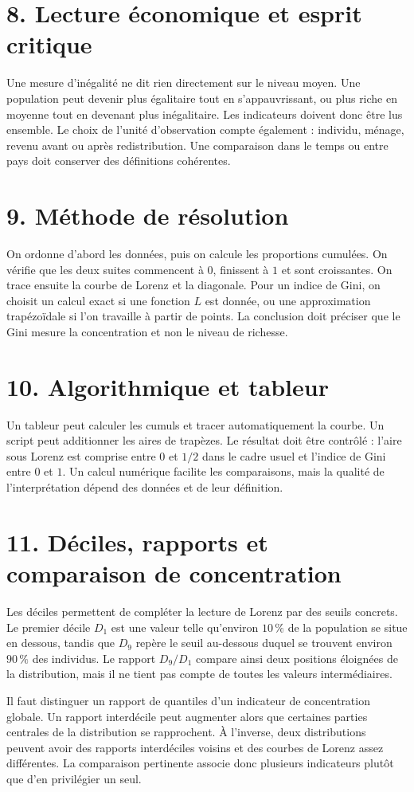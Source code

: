 \section{8. Lecture économique et esprit critique}
Une mesure d'inégalité ne dit rien directement sur le niveau moyen. Une population peut devenir plus égalitaire tout en s'appauvrissant, ou plus riche en moyenne tout en devenant plus inégalitaire. Les indicateurs doivent donc être lus ensemble.
Le choix de l'unité d'observation compte également : individu, ménage, revenu avant ou après redistribution. Une comparaison dans le temps ou entre pays doit conserver des définitions cohérentes.
\section{9. Méthode de résolution}
On ordonne d'abord les données, puis on calcule les proportions cumulées. On vérifie que les deux suites commencent à $0$, finissent à $1$ et sont croissantes. On trace ensuite la courbe de Lorenz et la diagonale.
Pour un indice de Gini, on choisit un calcul exact si une fonction $L$ est donnée, ou une approximation trapézoïdale si l'on travaille à partir de points. La conclusion doit préciser que le Gini mesure la concentration et non le niveau de richesse.
\section{10. Algorithmique et tableur}
Un tableur peut calculer les cumuls et tracer automatiquement la courbe. Un script peut additionner les aires de trapèzes. Le résultat doit être contrôlé : l'aire sous Lorenz est comprise entre $0$ et $1/2$ dans le cadre usuel et l'indice de Gini entre $0$ et $1$.
Un calcul numérique facilite les comparaisons, mais la qualité de l'interprétation dépend des données et de leur définition.
\section{11. Déciles, rapports et comparaison de concentration}
Les déciles permettent de compléter la lecture de Lorenz par des seuils concrets. Le premier décile $D_1$ est une valeur telle qu'environ $10\,\%$ de la population se situe en dessous, tandis que $D_9$ repère le seuil au-dessous duquel se trouvent environ $90\,\%$ des individus. Le rapport $D_9/D_1$ compare ainsi deux positions éloignées de la distribution, mais il ne tient pas compte de toutes les valeurs intermédiaires.

Il faut distinguer un rapport de quantiles d'un indicateur de concentration globale. Un rapport interdécile peut augmenter alors que certaines parties centrales de la distribution se rapprochent. À l'inverse, deux distributions peuvent avoir des rapports interdéciles voisins et des courbes de Lorenz assez différentes. La comparaison pertinente associe donc plusieurs indicateurs plutôt que d'en privilégier un seul.

